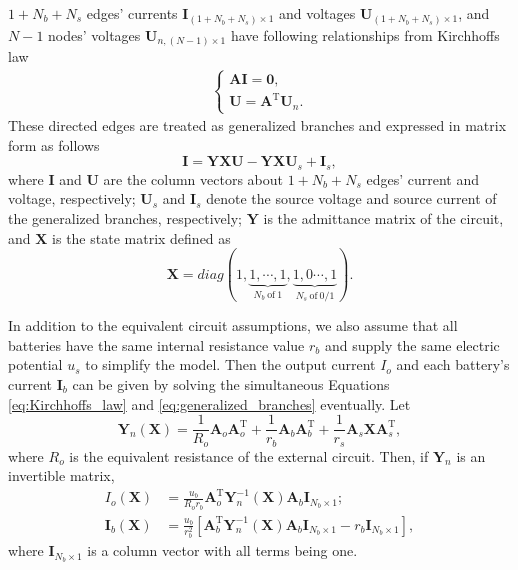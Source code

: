\documentclass{article}
\def\T{\mathrm{T}}
\begin{document}
$1+N_b+N_s$ edges' currents $\bm{I}_{(1+N_b+N_s)\times 1}$ and voltages $\bm{U}_{(1+N_b+N_s)\times 1}$, and $N-1$ nodes' voltages $\bm{U}_{n, (N-1)\times 1}$ have following relationships from Kirchhoffs law
\begin{align}\label{eq:Kirchhoffs_law}
    \begin{cases}
    \bm{A} \bm{I} = \bm{0}, \\
    \bm{U}        = \bm{A}^\T \bm{U}_n.
    \end{cases}
\end{align}
These directed edges are treated as generalized branches and expressed in matrix form as follows
\begin{equation}\label{eq:generalized_branches}
    \bm{I} = \bm{Y}\bm{X} \bm{U} - \bm{Y}\bm{X} \bm{U}_s +\bm{I}_s,
\end{equation}
where $\bm{I}$ and $\bm{U}$ are the column vectors about $1+N_b+N_s$ edges' current and voltage, respectively; 
$\bm{U}_s$ and $\bm{I}_s$ denote the source voltage and source current of the generalized branches, respectively;
$\bm{Y}$ is the admittance matrix of the circuit, and $\bm{X}$ is the state matrix defined as
\begin{equation}\label{eq:X}
    \bm{X} = diag(
        1,  
        \underbrace{1, \cdots, 1}_{N_b~\text{of}~1}, 
        \underbrace{1, 0 \cdots, 1}_{N_s~\text{of}~0/1}
    ).
\end{equation}


In addition to the equivalent circuit assumptions, we also assume that all batteries have the same internal resistance value $r_b$ and supply the same electric potential $u_s$ to simplify the model.
Then the output current $I_o$ and each battery's current $\bm{I}_b$ can be given by solving the simultaneous Equations \ref{eq:Kirchhoffs_law} and \ref{eq:generalized_branches} eventually.
Let
\begin{equation}\label{eq:Yn}
    \bm{Y}_n (\bm{X}) = \frac{1}{R_o} \bm{A}_o\bm{A}_o^\T + \frac{1}{r_b} \bm{A}_b\bm{A}_b^\T + \frac{1}{r_s}\bm{A}_s\bm{X}\bm{A}_s^\T,
\end{equation}
where $R_o$ is the equivalent resistance of the external circuit.
Then, if $\bm{Y}_n$ is an invertible matrix, 
\begin{align}
    I_o(\bm{X})      & = \frac{u_b}{R_o r_b} \bm{A}_o^\T \bm{Y}_n^{-1}(\bm{X}) \bm{A}_b \bm{I}_{N_b\times 1};\label{eq:I_o}\\
    \bm{I}_b(\bm{X}) & = \frac{u_b}{r_b^2}[\bm{A}_b^\T \bm{Y}_n^{-1}(\bm{X}) \bm{A}_b\bm{I}_{N_b \times 1}  -r_b \bm{I}_{N_b \times 1}],\label{eq:I_b}
\end{align}
where $\bm{I}_{N_b\times 1}$ is a column vector with all terms being one.
\end{document}
